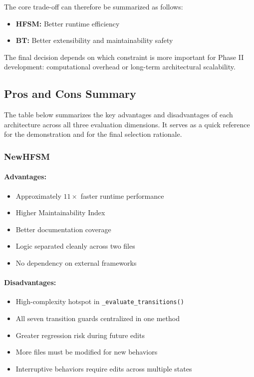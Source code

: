 \documentclass[12pt, a4paper]{report}
\begin{document}
The core trade-off can therefore be summarized as follows:

\begin{itemize}
    \item \textbf{HFSM:} Better runtime efficiency
    \item \textbf{BT:} Better extensibility and maintainability safety
\end{itemize}

The final decision depends on which constraint is more important for Phase II development: computational overhead or long-term architectural scalability.

\subsection{Pros and Cons Summary}

The table below summarizes the key advantages and disadvantages of each architecture across all three evaluation dimensions. It serves as a quick reference for the demonstration and for the final selection rationale.

\subsubsection{NewHFSM}

\paragraph{Advantages:}

\begin{itemize}
    \item Approximately $11\times$ faster runtime performance
    \item Higher Maintainability Index
    \item Better documentation coverage
    \item Logic separated cleanly across two files
    \item No dependency on external frameworks
\end{itemize}

\paragraph{Disadvantages:}

\begin{itemize}
    \item High-complexity hotspot in \texttt{\_evaluate\_transitions()}
    \item All seven transition guards centralized in one method
    \item Greater regression risk during future edits
    \item More files must be modified for new behaviors
    \item Interruptive behaviors require edits across multiple states
\end{itemize}
\end{document}
